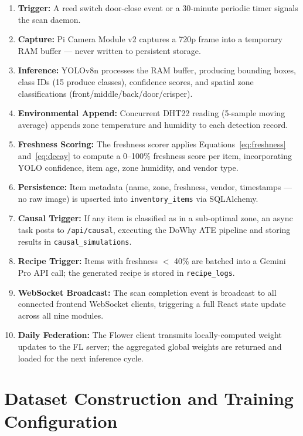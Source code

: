 \documentclass[12pt,a4paper]{report}
\begin{document}
\begin{enumerate}[leftmargin=2em, itemsep=0.15em]
    \item \textbf{Trigger:} A reed switch door-close event or a 30-minute periodic timer signals the scan daemon.
    \item \textbf{Capture:} Pi Camera Module v2 captures a 720p frame into a temporary RAM buffer — never written to persistent storage.
    \item \textbf{Inference:} YOLOv8n processes the RAM buffer, producing bounding boxes, class IDs (15 produce classes), confidence scores, and spatial zone classifications (front/middle/back/door/crisper).
    \item \textbf{Environmental Append:} Concurrent DHT22 reading (5-sample moving average) appends zone temperature and humidity to each detection record.
    \item \textbf{Freshness Scoring:} The freshness scorer applies Equations~\ref{eq:freshness} and~\ref{eq:decay} to compute a 0--100\% freshness score per item, incorporating YOLO confidence, item age, zone humidity, and vendor type.
    \item \textbf{Persistence:} Item metadata (name, zone, freshness, vendor, timestamps — no raw image) is upserted into \texttt{inventory\_items} via SQLAlchemy.
    \item \textbf{Causal Trigger:} If any item is classified as in a sub-optimal zone, an async task posts to \texttt{/api/causal}, executing the DoWhy ATE pipeline and storing results in \texttt{causal\_simulations}.
    \item \textbf{Recipe Trigger:} Items with freshness $<$ 40\% are batched into a Gemini Pro API call; the generated recipe is stored in \texttt{recipe\_logs}.
    \item \textbf{WebSocket Broadcast:} The scan completion event is broadcast to all connected frontend WebSocket clients, triggering a full React state update across all nine modules.
    \item \textbf{Daily Federation:} The Flower client transmits locally-computed weight updates to the FL server; the aggregated global weights are returned and loaded for the next inference cycle.
\end{enumerate}

\section{Dataset Construction and Training Configuration}
\end{document}
